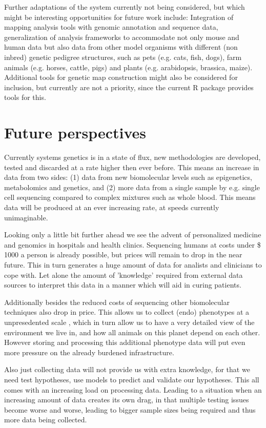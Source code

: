 Further adaptations of the system currently not being considered, but which might be interesting opportunities for 
future work include: Integration of mapping analysis tools with genomic annotation and sequence data, generalization 
of analysis frameworks to accommodate not only mouse and human data but also data from other model organisms with 
different (non inbred) genetic pedigree structures, such as pets (e.g. cats, fish, dogs), farm animals (e.g. horses, 
cattle, pigs) and plants (e.g. arabidopsis, brassica, maize). Additional tools for genetic map construction might 
also be considered for inclusion, but currently are not a priority, since the current R package provides tools for 
this.

\section{Future perspectives}
\label{sect:Future}
Currently systems genetics is in a state of flux, new methodologies are developed, tested and discarded at 
a rate higher then ever before. This means an increase in data from two sides: (1) data from new 
biomolecular levels such as epigenetics, metabolomics and genetics, and (2) more data from a single 
sample by e.g. single cell sequencing compared to complex mixtures such as whole blood. This means data 
will be produced at an ever increasing rate, at speeds currently unimaginable. 

Looking only a little bit further ahead we see the advent of personalized medicine and genomics in hospitals 
and health clinics. Sequencing humans at costs under \$ 1000 a person is already possible, but prices will remain 
to drop in the near future. This in turn generates a huge amount of data for analists and clinicians to cope with. 
Let alone the amount of 'knowledge' required from external data sources to interpret this data in a manner which 
will aid in curing patients.

Additionally besides the reduced costs of sequencing other biomolecular techniques also drop in price. 
This allows us to collect (endo) phenotypes at a unpresedented scale \cite{Schadt:2010}, which in turn allow us to have a very 
detailed view of the environment we live in, and how all animals on this planet depend on each other. 
However storing and processing this additional phenotype data will put even more pressure on the 
already burdened infrastructure.

Also just collecting data will not provide us with extra knowledge, for that we need test hypotheses, use 
models to predict and validate our hypotheses. This all comes with an increasing load on processing data. 
Leading to a situation when an increasing amount of data creates its own drag, in that multiple testing 
issues become worse and worse, leading to bigger sample sizes being required and thus more data being 
collected.

